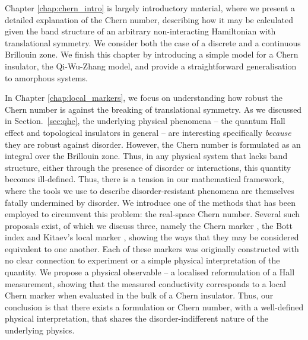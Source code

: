 Chapter \ref{chap:chern_intro} is largely introductory material, where we present a detailed explanation of the Chern number, describing how it may be calculated given the band structure of an arbitrary non-interacting Hamiltonian with translational symmetry. We consider both the case of a discrete and a continuous Brillouin zone. We finish this chapter by introducing a simple model for a Chern insulator, the Qi-Wu-Zhang model, and provide a straightforward generalisation to amorphous systems.

In Chapter \ref{chap:local_markers}, we focus on understanding how robust the Chern number is against the breaking of translational symmetry. As we discussed in Section.~\ref{sec:qhe}, the underlying physical phenomena -- the quantum Hall effect and topological insulators in general -- are interesting specifically \textit{because} they are robust against disorder. However, the Chern number is formulated as an integral over the Brillouin zone. Thus, in any physical system that lacks band structure, either through the presence of disorder or interactions, this quantity becomes ill-defined. Thus, there is a tension in our mathematical framework, where the tools we use to describe disorder-resistant phenomena are themselves fatally undermined by disorder. We introduce one of the methods that has been employed to circumvent this problem: the real-space Chern number. Several such proposals exist, of which we discuss three, namely the Chern marker \cite{bianco_mapping_2011}, the Bott index \cite{loring_guide_2019} and Kitaev's local marker \cite{kitaev_anyons_2006}, showing the ways that they may be considered equivalent to one another. Each of these markers was originally constructed with no clear connection to experiment or a simple physical interpretation of the quantity. We propose a physical observable -- a localised reformulation of a Hall measurement, showing that the measured conductivity corresponds to a local Chern marker when evaluated in the bulk of a Chern insulator. Thus, our conclusion is that there exists a formulation or Chern number, with a well-defined physical interpretation, that shares the disorder-indifferent nature of the underlying physics. 

